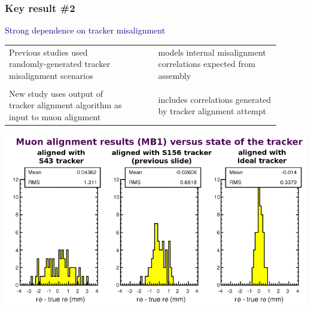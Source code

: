 \documentclass[compress]{beamer}
\begin{document}
\begin{frame}
\frametitle{Key result \#2}
\small

\hspace{-0.83 cm} \textcolor{darkblue}{\Large Strong dependence on tracker misalignment}

\vspace{0.25 cm} \renewcommand{\arraystretch}{0.6}
\begin{tabular}{p{0.45\linewidth} c p{0.45\linewidth}}
Previous studies used randomly-generated tracker misalignment scenarios & & models internal misalignment correlations expected from assembly \\

& & \\

New study uses output of tracker alignment algorithm as input to muon alignment & & includes correlations generated by tracker alignment attempt

\end{tabular}

\vspace{-0.1 cm}
\begin{center}
\includegraphics[width=0.7\linewidth]{muonalignment_MB1_dep_on_tracker.png}
\end{center}

\vspace{-1 cm}
\mbox{ }
\end{frame}
\end{document}
